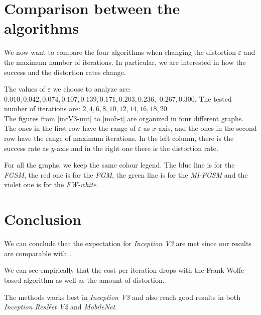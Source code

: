 \documentclass[10pt,twocolumn,letterpaper, english]{article}
\theoremstyle{definition}
\theoremstyle{plain}
\theoremstyle{plain}
\theoremstyle{plain}
\theoremstyle{plain}
\theoremstyle{remark}
\theoremstyle{remark}
\theoremstyle{definition}
\theoremstyle{definition}
\theoremstyle{definition}
\theoremstyle{definition}
\renewcommand{\epsilon}{\varepsilon}
\begin{document}
\section{Comparison between the algorithms}


We now want to compare the four algorithms when changing the distortion $\epsilon$ and the maximum number of iterations. 
In particular, we are interested in how the success and the distortion rates change. 

The values of $\epsilon$ we choose to analyze are: $0.010, 0.042, 0.074, 0.107, 0.139, 0.171, 0.203, 0.236,$  $0.267, 0.300$. The tested number of iterations are: $2,4,6,8,10,12,14,16,18,20$. \\

The figures from \ref{incV3-unt} to \ref{mob-t} are organized in four different graphs. 
The ones in the first row have the range of $\epsilon$ as $x$-axis, and the ones in the second row have the range of maximum iterations. 
In the left column, there is the success rate as $y$-axis and in the right one there is the distortion rate. 

For all the graphs, we keep the same colour legend. 
The blue line is for the \textit{FGSM}, the red one is for the \textit{PGM}, the green line is for the \textit{MI-FGSM} and the violet one is for the \textit{FW-white}. 


\section{Conclusion}

We can conclude that the expectation for \textit{Inception V3} are met since our results are comparable with \cite{frank}.

We can see empirically that the cost per iteration drops with the Frank Wolfe based algorithm as well as the amount of distortion.

The methods works best in \textit{Inception V3} and also reach good results in both \textit{Inception ResNet V2} and \textit{MobileNet}.



{\small


}


\newpage 
\onecolumn 
\end{document}
